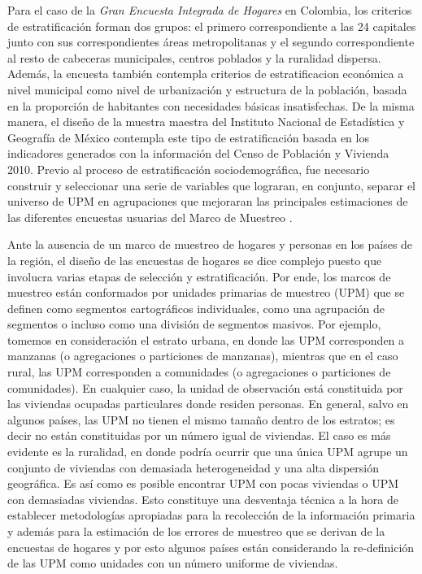 \documentclass[
  10pt,
  spanish,
]{book}
\begin{document}
Para el caso de la \emph{Gran Encuesta Integrada de Hogares} en Colombia, los criterios de estratificación forman dos grupos: el primero correspondiente a las 24 capitales junto con sus correspondientes áreas metropolitanas y el segundo correspondiente al resto de cabeceras municipales, centros poblados y la ruralidad dispersa. Además, la encuesta también contempla criterios de estratificacion económica a nivel municipal como nivel de urbanización y estructura de la población, basada en la proporción de habitantes con necesidades básicas insatisfechas. De la misma manera, el diseño de la muestra maestra del Instituto Nacional de Estadística y Geografía de México contempla este tipo de estratificación basada en los indicadores generados con la información del Censo de Población y Vivienda 2010. Previo al proceso de estratificación sociodemográfica, fue necesario construir y seleccionar una serie de variables que lograran, en conjunto, separar el universo de UPM en agrupaciones que mejoraran las principales estimaciones de las diferentes encuestas usuarias del Marco de Muestreo \citep{INEGI_MX_2012}.

Ante la ausencia de un marco de muestreo de hogares y personas en los países de la región, el diseño de las encuestas de hogares se dice complejo puesto que involucra varias etapas de selección y estratificación. Por ende, los marcos de muestreo están conformados por unidades primarias de muestreo (UPM) que se definen como segmentos cartográficos individuales, como una agrupación de segmentos o incluso como una división de segmentos masivos. Por ejemplo, tomemos en consideración el estrato urbana, en donde las UPM corresponden a manzanas (o agregaciones o particiones de manzanas), mientras que en el caso rural, las UPM corresponden a comunidades (o agregaciones o particiones de comunidades). En cualquier caso, la unidad de observación está constituida por las viviendas ocupadas particulares donde residen personas. En general, salvo en algunos países, las UPM no tienen el mismo tamaño dentro de los estratos; es decir no están constituidas por un número igual de viviendas. El caso es más evidente es la ruralidad, en donde podría ocurrir que una única UPM agrupe un conjunto de viviendas con demasiada heterogeneidad y una alta dispersión geográfica. Es así como es posible encontrar UPM con pocas viviendas o UPM con demasiadas viviendas. Esto constituye una desventaja técnica a la hora de establecer metodologías apropiadas para la recolección de la información primaria y además para la estimación de los errores de muestreo que se derivan de la encuestas de hogares y por esto algunos países están considerando la re-definición de las UPM como unidades con un número uniforme de viviendas.
\end{document}
